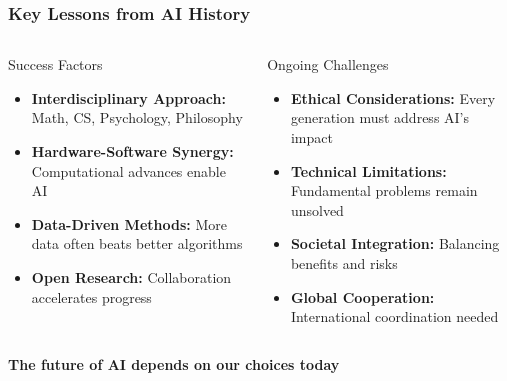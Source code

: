 \documentclass{beamer}
\begin{document}
\begin{frame}
    \frametitle{Key Lessons from AI History}
    \begin{columns}
        \begin{column}{0.48\textwidth}
            \begin{block}{Success Factors}
                \begin{itemize}
                    \item \textbf{Interdisciplinary Approach:} Math, CS, Psychology, Philosophy
                    \item \textbf{Hardware-Software Synergy:} Computational advances enable AI
                    \item \textbf{Data-Driven Methods:} More data often beats better algorithms
                    \item \textbf{Open Research:} Collaboration accelerates progress
                \end{itemize}
            \end{block}
        \end{column}
        \begin{column}{0.48\textwidth}
            \begin{exampleblock}{Ongoing Challenges}
                \begin{itemize}
                    \item \textbf{Ethical Considerations:} Every generation must address AI's impact
                    \item \textbf{Technical Limitations:} Fundamental problems remain unsolved
                    \item \textbf{Societal Integration:} Balancing benefits and risks
                    \item \textbf{Global Cooperation:} International coordination needed
                \end{itemize}
            \end{exampleblock}
        \end{column}
    \end{columns}
    
    \begin{center}
        \textcolor{MyBlue}{\textbf{The future of AI depends on our choices today}}
    \end{center}
\end{frame}
\end{document}
